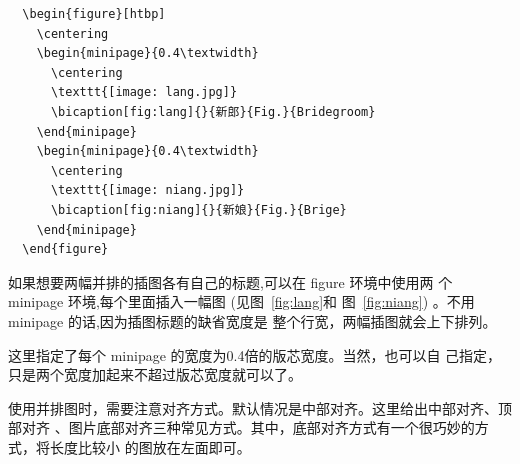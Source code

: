 \begin{lstlisting}
  \begin{figure}[htbp]
    \centering
    \begin{minipage}{0.4\textwidth}
      \centering
      \texttt{[image: lang.jpg]}
      \bicaption[fig:lang]{}{新郎}{Fig.}{Bridegroom}
    \end{minipage}
    \begin{minipage}{0.4\textwidth}
      \centering
      \texttt{[image: niang.jpg]}
      \bicaption[fig:niang]{}{新娘}{Fig.}{Brige}
    \end{minipage}
  \end{figure}
\end{lstlisting}

如果想要两幅并排的插图各有自己的标题,可以在 figure 环境中使用两
个 minipage 环境,每个里面插入一幅图 (见图~\ref{fig:lang}和
图~\ref{fig:niang}) 。不用 minipage 的话,因为插图标题的缺省宽度是
整个行宽，两幅插图就会上下排列。

这里指定了每个 minipage 的宽度为0.4倍的版芯宽度。当然，也可以自
己指定，只是两个宽度加起来不超过版芯宽度就可以了。

使用并排图时，需要注意对齐方式。默认情况是中部对齐。这里给出中部对齐、顶部对齐
、图片底部对齐三种常见方式。其中，底部对齐方式有一个很巧妙的方式，将长度比较小
的图放在左面即可。

